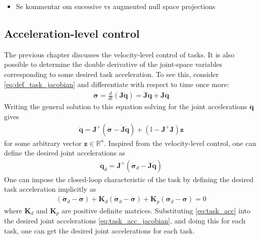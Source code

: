 {
    \color{red}
    \begin{itemize}
        \item Se kommentar om sucessive vs augmented null space projections
    \end{itemize}
}


\subsection{Acceleration-level control}

The previous chapter discusses the velocity-level control of tasks. It is also 
possible to determine the double derivative of the joint-space variables corresponding to some
desired task acceleration. To see this, consider \autoref{eq:def_task_jacobian} and differentiate
with respect to time once more:
\begin{align}
    \ddot{\bm{\sigma}} = \frac{d}{dt}\left(\bm{J} \dot{\bm{q}}\right) = \dot{\bm{J}} \dot{\bm{q}} + \bm{J} \ddot{\bm{q}}
    \label{eq:task_acc_jacobian}
\end{align}
Writing the general solution to this equation solving for the joint accelerations
$\ddot{\bm{q}}$ gives
\begin{align}
    \ddot{\bm{q}} = \bm{J}^{+} \left(\ddot{\bm{\sigma}} - \dot{\bm{J}}\dot{\bm{q}}\right) +
    \left(\mathbb{I} - \bm{J}^{+}\bm{J}\right) \bm{z} \label{eq:task_acc_control}
\end{align}
for some arbitrary vector $\bm{z} \in \mathbb{R}^n$. Inspired from the
velocity-level control, one can define the desired joint accelerations as
\begin{align}
    \ddot{\bm{q}}_d = \bm{J}^{+} \left(\ddot{\bm{\sigma}}_d
    - \dot{\bm{J}}\dot{\bm{q}}\right) \label{eq:task_priority_acc}
\end{align}
One can impose the closed-loop characteristic of the task by defining the desired
task acceleration implicitly as
\begin{align}
    \left(\ddot{\bm{\sigma}}_d - \ddot{\bm{\sigma}}\right) +
    \bm{K}_d\left(\dot{\bm{\sigma}}_d - \dot{\bm{\sigma}}\right) +
    \bm{K}_p\left(\bm{\sigma}_d - \bm{\sigma}\right) = 0 \label{eq:task_acc}
\end{align}
where $\bm{K}_d$ and $\bm{K}_p$ are positive definite matrices. Substituting
\autoref{eq:task_acc} into the desired joint accelerations \autoref{eq:task_acc_jacobian},
and doing this for each task, one can get the desired joint accelerations for each task.
